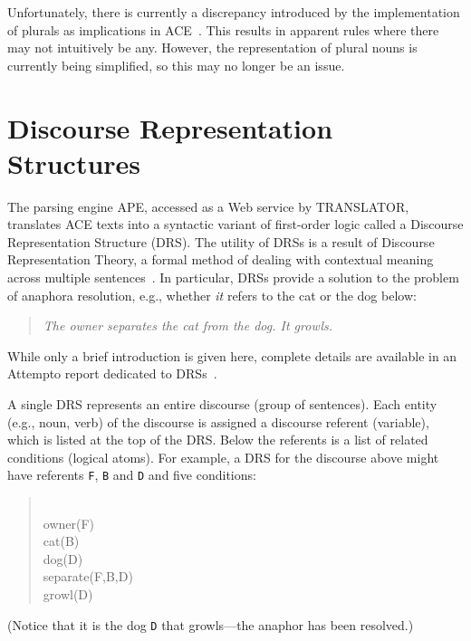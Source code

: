 \documentclass[12pt]{report}
\begin{document}
Unfortunately, there is currently a discrepancy introduced by the implementation of plurals as implications in ACE~\cite{schwertel}. This results in apparent rules where there may not intuitively be any. However, the representation of plural nouns is currently being simplified, so this may no longer be an issue.

\section{Discourse Representation Structures}

The parsing engine APE, accessed as a Web service by TRANSLATOR, translates ACE texts into a syntactic variant of first-order logic called a Discourse Representation Structure (DRS). The utility of DRSs is a result of Discourse Representation Theory, a formal method of dealing with contextual meaning across multiple sentences~\cite{kamp}. In particular, DRSs provide a solution to the problem of anaphora resolution, e.g., whether \textit{it} refers to the cat or the dog below:
\begin{quote}
\textit{The owner separates the cat from the dog. It growls.}
\end{quote}
While only a brief introduction is given here, complete details are available in an Attempto report dedicated to DRSs~\cite{drs}.

A single DRS represents an entire discourse (group of sentences). Each entity (e.g., noun, verb) of the discourse is assigned a discourse referent (variable), which is listed at the top of the DRS. Below the referents is a list of related conditions (logical atoms). For example, a DRS for the discourse above might have referents \verb|F|, \verb|B| and \verb|D| and five conditions:
\begin{quote}
\ttfamily
[F B D]\\
owner(F)\\
cat(B)\\
dog(D)\\
separate(F,B,D)\\
growl(D)
\end{quote}
\normalfont
(Notice that it is the dog \verb|D| that growls---the anaphor has been resolved.)
\end{document}
